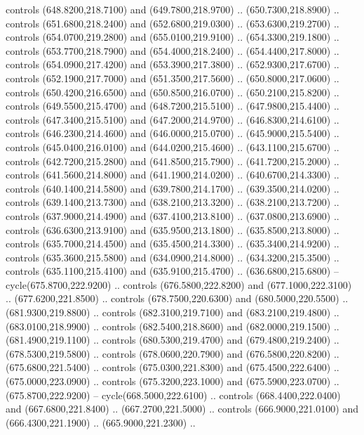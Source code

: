 {\begin{scope}[y=0.80pt, x=0.80pt, yscale=-1, xscale=1, inner sep=0pt, outer sep=0pt, #1]
      controls (648.8200,218.7100) and (649.7800,218.9700) .. (650.7300,218.8900) ..
      controls (651.6800,218.2400) and (652.6800,219.0300) .. (653.6300,219.2700) ..
      controls (654.0700,219.2800) and (655.0100,219.9100) .. (654.3300,219.1800) ..
      controls (653.7700,218.7900) and (654.4000,218.2400) .. (654.4400,217.8000) ..
      controls (654.0900,217.4200) and (653.3900,217.3800) .. (652.9300,217.6700) ..
      controls (652.1900,217.7000) and (651.3500,217.5600) .. (650.8000,217.0600) ..
      controls (650.4200,216.6500) and (650.8500,216.0700) .. (650.2100,215.8200) ..
      controls (649.5500,215.4700) and (648.7200,215.5100) .. (647.9800,215.4400) ..
      controls (647.3400,215.5100) and (647.2000,214.9700) .. (646.8300,214.6100) ..
      controls (646.2300,214.4600) and (646.0000,215.0700) .. (645.9000,215.5400) ..
      controls (645.0400,216.0100) and (644.0200,215.4600) .. (643.1100,215.6700) ..
      controls (642.7200,215.2800) and (641.8500,215.7900) .. (641.7200,215.2000) ..
      controls (641.5600,214.8000) and (641.1900,214.0200) .. (640.6700,214.3300) ..
      controls (640.1400,214.5800) and (639.7800,214.1700) .. (639.3500,214.0200) ..
      controls (639.1400,213.7300) and (638.2100,213.3200) .. (638.2100,213.7200) ..
      controls (637.9000,214.4900) and (637.4100,213.8100) .. (637.0800,213.6900) ..
      controls (636.6300,213.9100) and (635.9500,213.1800) .. (635.8500,213.8000) ..
      controls (635.7000,214.4500) and (635.4500,214.3300) .. (635.3400,214.9200) ..
      controls (635.3600,215.5800) and (634.0900,214.8000) .. (634.3200,215.3500) ..
      controls (635.1100,215.4100) and (635.9100,215.4700) .. (636.6800,215.6800) --
      cycle(675.8700,222.9200) .. controls (676.5800,222.8200) and
      (677.1000,222.3100) .. (677.6200,221.8500) .. controls (678.7500,220.6300) and
      (680.5000,220.5500) .. (681.9300,219.8800) .. controls (682.3100,219.7100) and
      (683.2100,219.4800) .. (683.0100,218.9900) .. controls (682.5400,218.8600) and
      (682.0000,219.1500) .. (681.4900,219.1100) .. controls (680.5300,219.4700) and
      (679.4800,219.2400) .. (678.5300,219.5800) .. controls (678.0600,220.7900) and
      (676.5800,220.8200) .. (675.6800,221.5400) .. controls (675.0300,221.8300) and
      (675.4500,222.6400) .. (675.0000,223.0900) .. controls (675.3200,223.1000) and
      (675.5900,223.0700) .. (675.8700,222.9200) -- cycle(668.5000,222.6100) ..
      controls (668.4400,222.0400) and (667.6800,221.8400) .. (667.2700,221.5000) ..
      controls (666.9000,221.0100) and (666.4300,221.1900) .. (665.9000,221.2300) ..

\end{scope}}
